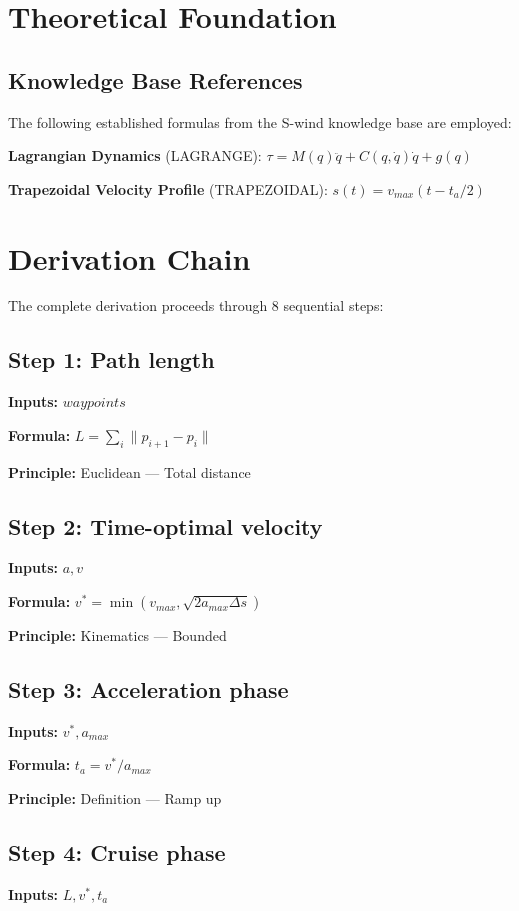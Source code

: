 \documentclass[11pt,twocolumn]{article}
\begin{document}
\section{Theoretical Foundation}

\subsection{Knowledge Base References}
The following established formulas from the S-wind knowledge base are employed:

\textbf{Lagrangian Dynamics} (LAGRANGE): $\tau = M(q)\ddot{q} + C(q,\dot{q})\dot{q} + g(q)$ \cite{Lagrange}

\textbf{Trapezoidal Velocity Profile} (TRAPEZOIDAL): $s(t) = v_{max}(t - t_a/2)$ \cite{Motion Control}


\section{Derivation Chain}

The complete derivation proceeds through 8 sequential steps:

\subsection*{Step 1: Path length}
\textbf{Inputs:} $waypoints$

\textbf{Formula:} $L = \sum_i \|p_{i+1} - p_i\|$

\textbf{Principle:} Euclidean --- Total distance

\subsection*{Step 2: Time-optimal velocity}
\textbf{Inputs:} $a, v$

\textbf{Formula:} $v^* = \min(v_{max}, \sqrt{2a_{max}\Delta s})$

\textbf{Principle:} Kinematics --- Bounded

\subsection*{Step 3: Acceleration phase}
\textbf{Inputs:} $v^*, a_{max}$

\textbf{Formula:} $t_a = v^*/a_{max}$

\textbf{Principle:} Definition --- Ramp up

\subsection*{Step 4: Cruise phase}
\textbf{Inputs:} $L, v^*, t_a$
\end{document}
